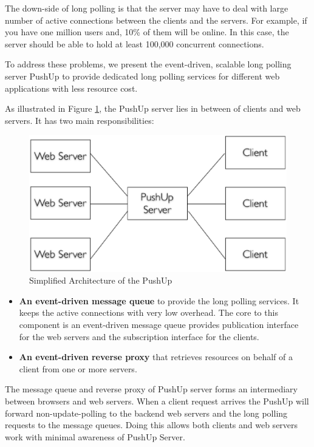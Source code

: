 The down-side of long polling is that the server may have to deal with large
number of active connections between the clients and the servers. For example,
if you have one million users and, 10\% of them will be online. In this case,
the server should be able to hold at least 100,000 concurrent connections.

To address these problems, we present the event-driven\cite{UnixBook}, scalable
long polling server PushUp to provide dedicated long polling services for 
different web applications with less resource cost.

As illustrated in Figure \ref{fig:sim_pushup}, the PushUp server lies in 
between of clients and web servers. It has two main responsibilities:
\begin{figure}[htb!]
\centering
    \includegraphics[scale=0.40]{figures/sim_pushup.eps}
    \caption{Simplified Architecture of the PushUp}
    \label{fig:sim_pushup}
\end{figure}

\begin {itemize}
\item {\bf An event-driven message queue}\cite{PubSub} to provide the long 
polling services. It keeps the active connections with very low overhead.
The core to this component is an event-driven message queue provides
publication interface for the web servers and the subscription interface
for the clients.
\item {\bf An event-driven reverse proxy}\cite{ReverseProxy} that retrieves 
resources on behalf of a client from one or more servers.
\end {itemize}

The message queue and reverse proxy of PushUp server forms an intermediary
between browsers and web servers. When a client request arrives the PushUp
will forward non-update-polling to the backend web servers and the long 
polling requests to the message queues. Doing this allows both clients and
web servers work with minimal awareness of PushUp Server. 
